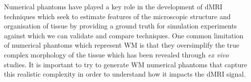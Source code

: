 \begin{comment}
This paper presents Contextual Fibre Growth (ConFiG), an approach to generate white matter numerical phantoms by mimicking natural fibre genesis. ConFiG grows fibres one-by-one, following simple rules motivated by real axonal guidance mechanisms. These simple rules enable ConFiG to generate phantoms with tuneable microstructural features by growing fibres while attempting to meet morphological targets such as user-specified density and orientation distribution. We compare ConFiG to the state-of-the-art approach based on packing fibres together by generating phantoms in a range of fibre configurations including crossing fibre bundles and orientation dispersion. Results demonstrate that ConFiG produces phantoms with up to 20\% higher densities than the state-of-the-art, particularly in complex configurations with crossing fibres. We additionally show that the microstructural morphology of ConFiG phantoms is comparable to real tissue, producing diameter and orientation distributions close to electron microscopy estimates from real tissue as well as capturing complex fibre cross sections. Signals simulated from ConFiG phantoms match real diffusion MRI data well, showing that ConFiG phantoms can be used to generate realistic diffusion MRI data. This demonstrates the feasibility of ConFiG to generate realistic synthetic diffusion MRI data for developing and validating microstructure modelling approaches.
\end{comment}

Numerical phantoms have played a key role in the development of \ac{dMRI} techniques which seek to estimate features of the microscopic structure and organisation of tissue by providing a ground truth for simulation experiments against which we can validate and compare techniques.
One common limitation of numerical phantoms which represent \ac{WM} is that they oversimplify the true complex morphology of the tissue which has been revealed through \emph{ex vivo} studies.
It is important to try to generate \ac{WM} numerical phantoms that capture this realistic complexity in order to understand how it impacts the \ac{dMRI} signal. 

